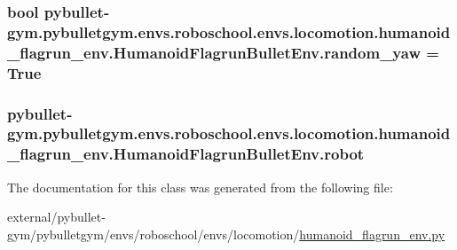 \subsubsection[{\texorpdfstring{random\+\_\+yaw}{random_yaw}}]{\setlength{\rightskip}{0pt plus 5cm}bool pybullet-\/gym.\+pybulletgym.\+envs.\+roboschool.\+envs.\+locomotion.\+humanoid\+\_\+flagrun\+\_\+env.\+Humanoid\+Flagrun\+Bullet\+Env.\+random\+\_\+yaw = True\hspace{0.3cm}{\ttfamily [static]}}\hypertarget{classpybullet-gym_1_1pybulletgym_1_1envs_1_1roboschool_1_1envs_1_1locomotion_1_1humanoid__flagru3f2c7cfb3b7b479419ab25a1807bf084_a1f69a8594d4143d69114625d9df03abf}{}\label{classpybullet-gym_1_1pybulletgym_1_1envs_1_1roboschool_1_1envs_1_1locomotion_1_1humanoid__flagru3f2c7cfb3b7b479419ab25a1807bf084_a1f69a8594d4143d69114625d9df03abf}
\subsubsection[{\texorpdfstring{robot}{robot}}]{\setlength{\rightskip}{0pt plus 5cm}pybullet-\/gym.\+pybulletgym.\+envs.\+roboschool.\+envs.\+locomotion.\+humanoid\+\_\+flagrun\+\_\+env.\+Humanoid\+Flagrun\+Bullet\+Env.\+robot}\hypertarget{classpybullet-gym_1_1pybulletgym_1_1envs_1_1roboschool_1_1envs_1_1locomotion_1_1humanoid__flagru3f2c7cfb3b7b479419ab25a1807bf084_ab5b285513ba8e7ff586f782af5454f23}{}\label{classpybullet-gym_1_1pybulletgym_1_1envs_1_1roboschool_1_1envs_1_1locomotion_1_1humanoid__flagru3f2c7cfb3b7b479419ab25a1807bf084_ab5b285513ba8e7ff586f782af5454f23}


The documentation for this class was generated from the following file\+:\begin{DoxyCompactItemize}
\item 
external/pybullet-\/gym/pybulletgym/envs/roboschool/envs/locomotion/\hyperlink{humanoid__flagrun__env_8py}{humanoid\+\_\+flagrun\+\_\+env.\+py}\end{DoxyCompactItemize}
